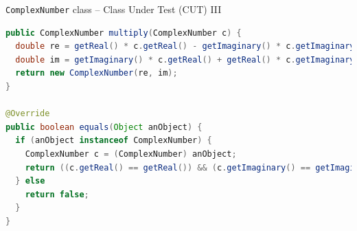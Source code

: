 \documentclass[11pt, xcolor=svgnames]{beamer}
\begin{document}

\begin{frame}[fragile]{\texttt{ComplexNumber} class -- Class Under Test (CUT) III}

\begin{lstlisting}[language=Java,basicstyle=\scriptsize]
public ComplexNumber multiply(ComplexNumber c) {
  double re = getReal() * c.getReal() - getImaginary() * c.getImaginary();
  double im = getImaginary() * c.getReal() + getReal() * c.getImaginary();
  return new ComplexNumber(re, im);
}

@Override
public boolean equals(Object anObject) {
  if (anObject instanceof ComplexNumber) {
    ComplexNumber c = (ComplexNumber) anObject;
    return ((c.getReal() == getReal()) && (c.getImaginary() == getImaginary()));
  } else
    return false;
  }
}
\end{lstlisting}

\end{frame}





%
%  
%  
%  
%



%
%
%
%      
%
\end{document}
